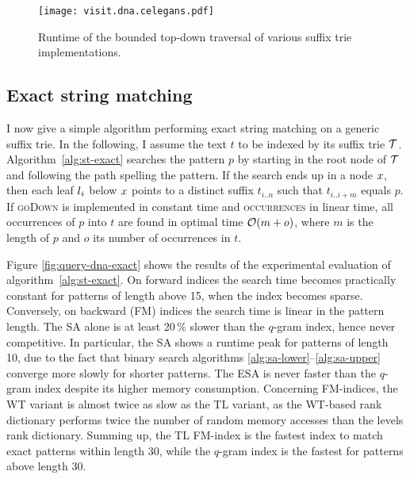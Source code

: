 \begin{figure}[b]
\begin{center}
\caption[Top-down traversal runtime]{Runtime of the bounded top-down traversal of various suffix trie implementations.}
\label{fig:visit-dna}
\texttt{[image: visit.dna.celegans.pdf]}
\end{center}
\end{figure}

\subsection{Exact string matching}
\label{sec:index:algo:exact}

I now give a simple algorithm performing exact string matching on a generic suffix trie.
In the following, I assume the text $t$ to be indexed by its suffix trie $\mathcal {T}$.
Algorithm~\ref{alg:st-exact} searches the pattern $p$ by starting in the root node of $\mathcal {T}$ and following the path spelling the pattern.
If the search ends up in a node $x$, then each leaf $l_i$ below $x$ points to a distinct suffix $t_{i..n}$ such that $t_{i..i+m}$ equals $p$.
If \textsc{goDown} is implemented in constant time and \textsc{occurrences} in linear time, all occurrences of $p$ into $t$ are found in optimal time $\mathcal{O}(m+o)$, where $m$ is the length of $p$ and $o$ its number of occurrences in $t$.

Figure \ref{fig:query-dna-exact} shows the results of the experimental evaluation of algorithm~\ref{alg:st-exact}.
On forward indices the search time becomes practically constant for patterns of length above 15, \ie when the index becomes sparse.
Conversely, on backward (FM) indices the search time is linear in the pattern length. 
The SA alone is at least 20\,\% slower than the $q$-gram index, hence never competitive.
In particular, the SA shows a runtime peak for patterns of length 10, due to the fact that binary search algorithms \ref{alg:sa-lower}--\ref{alg:sa-upper} converge more slowly for shorter patterns.
The ESA is never faster than the $q$-gram index despite its higher memory consumption.
Concerning FM-indices, the WT variant is almost twice as slow as the TL variant, as the WT-based rank dictionary performs twice the number of random memory accesses than the levels rank dictionary.
Summing up, the TL FM-index is the fastest index to match exact patterns within length 30, while the $q$-gram index is the fastest for patterns above length 30.

